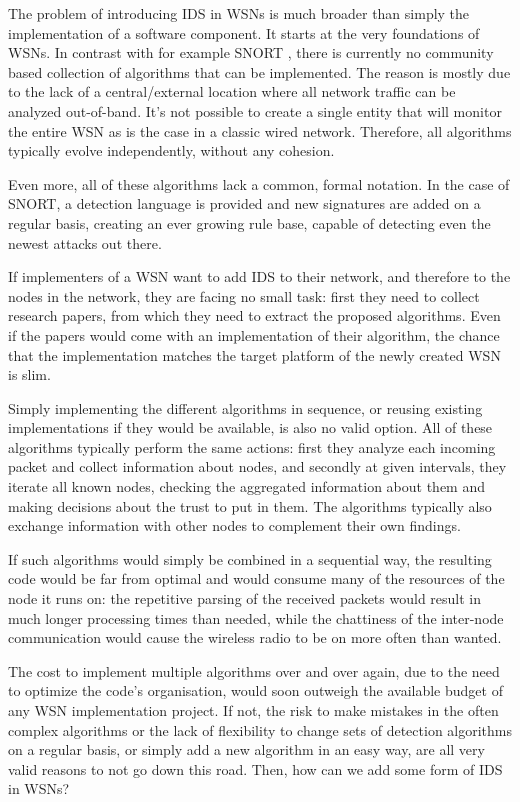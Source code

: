 \documentclass[conference]{IEEEtran}
\begin{document}
The problem of introducing IDS in WSNs is much broader than simply the
implementation of a software component. It starts at the very foundations of
WSNs. In contrast with for example SNORT \cite{roesch1999snort}, there is
currently no community based collection of algorithms that can be implemented.
The reason is mostly due to the lack of a central/external location where all
network traffic can be analyzed out-of-band. It's not possible to create a
single entity that will monitor the entire WSN as is the case in a classic
wired network. Therefore, all algorithms typically evolve independently,
without any cohesion.

Even more, all of these algorithms lack a common, formal notation. In the case
of SNORT, a detection language is provided and new signatures are added on a
regular basis, creating an ever growing rule base, capable of detecting even
the newest attacks out there.

If implementers of a WSN want to add IDS to their network, and therefore to the
nodes in the network, they are facing no small task: first they need to collect
research papers, from which they need to extract the proposed algorithms. Even
if the papers would come with an implementation of their algorithm, the chance
that the implementation matches the target platform of the newly created WSN is
slim.

Simply implementing the different algorithms in sequence, or reusing existing
implementations if they would be available, is also no valid option. All of
these algorithms typically perform the same actions: first they analyze each
incoming packet and collect information about nodes, and secondly at given
intervals, they iterate all known nodes, checking the aggregated information
about them and making decisions about the trust to put in them. The algorithms
typically also exchange information with other nodes to complement their own
findings.

If such algorithms would simply be combined in a sequential way, the resulting
code would be far from optimal and would consume many of the resources of the
node it runs on: the repetitive parsing of the received packets would result in
much longer processing times than needed, while the chattiness of the
inter-node communication would cause the wireless radio to be on more often
than wanted.

The cost to implement multiple algorithms over and over again, due to the need
to optimize the code's organisation, would soon outweigh the available budget
of any WSN implementation project. If not, the risk to make mistakes in the
often complex algorithms or the lack of flexibility to change sets of detection
algorithms on a regular basis, or simply add a new algorithm in an easy way,
are all very valid reasons to not go down this road. Then, how can we add some
form of IDS in WSNs?
\end{document}
